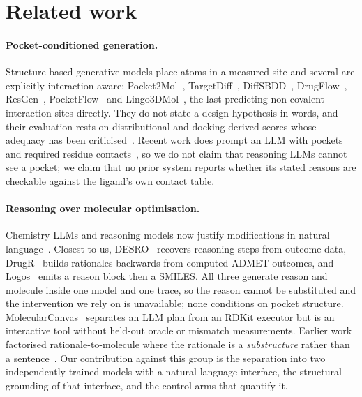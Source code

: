 \section{Related work}

\paragraph{Pocket-conditioned generation.} Structure-based generative models place atoms in a
measured site and several are explicitly interaction-aware: Pocket2Mol~\citep{peng2022pocket2mol},
TargetDiff~\citep{guan2023targetdiff}, DiffSBDD~\citep{schneuing2024diffsbdd},
DrugFlow~\citep{schneuing2025drugflow}, ResGen~\citep{resgen2023}, PocketFlow~\citep{jiang2024pocketflow}
and Lingo3DMol~\citep{feng2024lingo3dmol}, the last predicting non-covalent interaction sites
directly. They do not state a design hypothesis in words, and their evaluation rests on
distributional and docking-derived scores whose adequacy has been
criticised~\citep{cieplinski2023dockwell,harris2023posecheck,buttenschoen2024posebusters}. Recent
work does prompt an LLM with pockets and required residue contacts~\citep{macdougall2026spatial}, so
we do not claim that reasoning LLMs cannot see a pocket; we claim that no prior system reports
whether its stated reasons are checkable against the ligand's own contact table.

\paragraph{Reasoning over molecular optimisation.} Chemistry LLMs and reasoning models now justify
modifications in natural language~\citep{zhao2024chemdfm,narayanan2025ether0,cavanagh2024smileyllama,
fang2023molinstructions,zhang2024chemllm}. Closest to us, DESRO~\citep{liu2026desro} recovers
reasoning steps from outcome data, DrugR~\citep{liu2026drugr} builds rationales backwards from
computed ADMET outcomes, and Logos~\citep{wen2026logos} emits a reason block then a SMILES. All
three generate reason and molecule inside one model and one trace, so the reason cannot be
substituted and the intervention we rely on is unavailable; none conditions on pocket structure.
MolecularCanvas~\citep{dong2026molecularcanvas} separates an LLM plan from an RDKit executor but is
an interactive tool without held-out oracle or mismatch measurements. Earlier work factorised
rationale-to-molecule where the rationale is a \emph{substructure} rather than a
sentence~\citep{jin2020rationale}. Our contribution against this group is the separation into two
independently trained models with a natural-language interface, the structural grounding of that
interface, and the control arms that quantify it.

